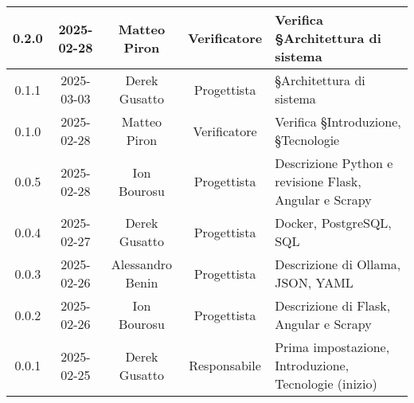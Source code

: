 \begin{longtable}{|c|c|c|c|p{4cm}|}
        0.2.0 & 2025-02-28 & Matteo Piron & Verificatore & Verifica §Architettura di sistema \\
        \hline
        0.1.1 & 2025-03-03 & Derek Gusatto & Progettista & §Architettura di sistema \\
        \hline
        0.1.0 & 2025-02-28 & Matteo Piron & Verificatore & Verifica §Introduzione, §Tecnologie \\
        \hline
        0.0.5 & 2025-02-28 & Ion Bourosu & Progettista & Descrizione Python e revisione Flask, Angular e Scrapy \\
        \hline
        0.0.4 & 2025-02-27 & Derek Gusatto & Progettista & Docker, PostgreSQL, SQL \\
        \hline
        0.0.3 & 2025-02-26 & Alessandro Benin & Progettista & Descrizione di Ollama, JSON, YAML \\
        \hline
        0.0.2 & 2025-02-26 & Ion Bourosu & Progettista & Descrizione di Flask, Angular e Scrapy \\
        \hline
        0.0.1 & 2025-02-25 & Derek Gusatto & Responsabile & Prima impostazione, Introduzione, Tecnologie (inizio) \\
        \hline
\end{longtable}
